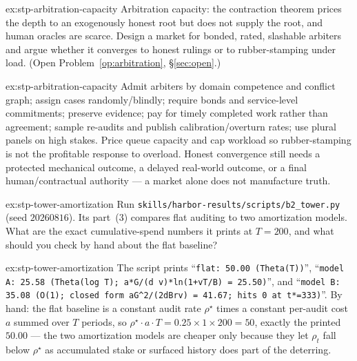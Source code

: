 \documentclass[11pt,a4paper]{article}
\theoremstyle{definition}
\begin{document}
\begin{pdexercise}[kind=Open,rating=3]{ex:stp-arbitration-capacity}
Arbitration capacity: the contraction theorem prices the depth to an
exogenously honest root but does not supply the root, and human oracles are
scarce. Design a market for bonded, rated, slashable arbiters and argue
whether it converges to honest rulings or to rubber-stamping under load.
(Open Problem~\ref{op:arbitration}, \S\ref{sec:open}.)
\end{pdexercise}
\begin{pdsolution}{ex:stp-arbitration-capacity}
Admit arbiters by domain competence and conflict graph; assign cases
randomly/blindly; require bonds and service-level commitments; preserve
evidence; pay for timely completed work rather than agreement; sample
re-audits and publish calibration/overturn rates; use plural panels on high
stakes. Price queue capacity and cap workload so rubber-stamping is not the
profitable response to overload. Honest convergence still needs a protected
mechanical outcome, a delayed real-world outcome, or a final human/contractual
authority --- a market alone does not manufacture truth.
\end{pdsolution}
\begin{pdexercise}[kind=Trace,rating=2]{ex:stp-tower-amortization}
Run \texttt{skills/harbor-results/scripts/b2\_tower.py} (seed $20260816$).
Its part~(3) compares flat auditing to two amortization models. What are the
exact cumulative-spend numbers it prints at $T=200$, and what should you
check by hand about the flat baseline?
\end{pdexercise}
\begin{pdsolution}{ex:stp-tower-amortization}
The script prints ``\texttt{flat: 50.00 (Theta(T))}'', ``\texttt{model A:
25.58 (Theta(log T); a*G/(d v)*ln(1+vT/B) = 25.50)}'', and ``\texttt{model B:
35.08 (O(1); closed form aG\textasciicircum2/(2dBrv) = 41.67; hits 0 at
t*=333)}''. By hand: the flat baseline is a constant audit rate $\rho^\star$
times a constant per-audit cost $a$ summed over $T$ periods, so
$\rho^\star\cdot a\cdot T=0.25\times 1\times 200=50$, exactly the printed
$50.00$ --- the two amortization models are cheaper only because they let
$\rho_t$ fall below $\rho^\star$ as accumulated stake or surfaced history
does part of the deterring.
\end{pdsolution}

\end{document}
